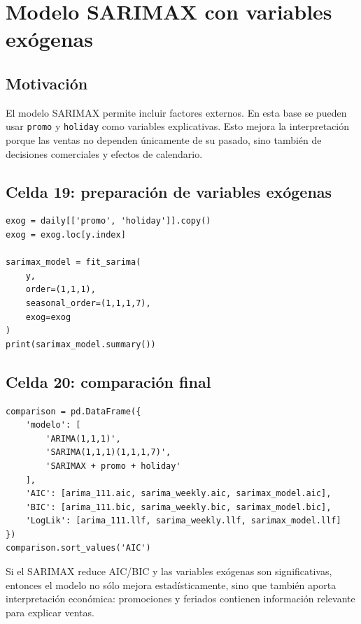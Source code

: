 \documentclass[11pt,letterpaper]{article}
\newcommand{\code}[1]{\texttt{#1}}
\begin{document}
\section{Modelo SARIMAX con variables exógenas}

\subsection{Motivación}

\begin{markdowncell}
El modelo SARIMAX permite incluir factores externos. En esta base se pueden usar \code{promo} y \code{holiday} como variables explicativas. Esto mejora la interpretación porque las ventas no dependen únicamente de su pasado, sino también de decisiones comerciales y efectos de calendario.
\end{markdowncell}

\subsection{Celda 19: preparación de variables exógenas}

\begin{lstlisting}[style=pythoncolab]
exog = daily[['promo', 'holiday']].copy()
exog = exog.loc[y.index]

sarimax_model = fit_sarima(
    y,
    order=(1,1,1),
    seasonal_order=(1,1,1,7),
    exog=exog
)
print(sarimax_model.summary())
\end{lstlisting}

\subsection{Celda 20: comparación final}

\begin{lstlisting}[style=pythoncolab]
comparison = pd.DataFrame({
    'modelo': [
        'ARIMA(1,1,1)',
        'SARIMA(1,1,1)(1,1,1,7)',
        'SARIMAX + promo + holiday'
    ],
    'AIC': [arima_111.aic, sarima_weekly.aic, sarimax_model.aic],
    'BIC': [arima_111.bic, sarima_weekly.bic, sarimax_model.bic],
    'LogLik': [arima_111.llf, sarima_weekly.llf, sarimax_model.llf]
})
comparison.sort_values('AIC')
\end{lstlisting}

\begin{interpretacion}
Si el SARIMAX reduce AIC/BIC y las variables exógenas son significativas, entonces el modelo no sólo mejora estadísticamente, sino que también aporta interpretación económica: promociones y feriados contienen información relevante para explicar ventas.
\end{interpretacion}
\end{document}
